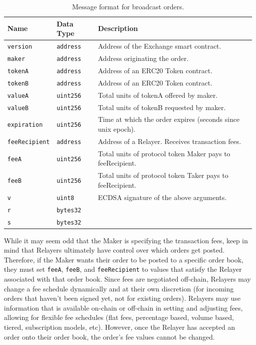 \documentclass[10pt]{article}
\begin{document}
\begin{table}[h]
\centering
\caption{Message format for broadcast orders.}
\label{table:table2}
\begin{tabular}{|l|l|l|}
\hline
\textbf{Name} & \textbf{Data Type} & \textbf{Description} \\ \hline
\texttt{version} & \texttt{address} & Address of the Exchange smart contract. \\ \hline
\texttt{maker} & \texttt{address} & Address originating the order.  \\ \hline
\texttt{tokenA} & \texttt{address} & Address of an ERC20 Token contract. \\ \hline
\texttt{tokenB} & \texttt{address} & Address of an ERC20 Token contract. \\ \hline
\texttt{valueA} & \texttt{uint256} & Total units of tokenA offered by maker. \\ \hline
\texttt{valueB} & \texttt{uint256} & Total units of tokenB requested by maker. \\ \hline
\texttt{expiration} & \texttt{uint256} & Time at which the order expires (seconds since unix epoch). \\ \hline
\texttt{feeRecipient} & \texttt{address} & Address of a Relayer. Receives transaction fees. \\ \hline
\texttt{feeA} & \texttt{uint256} & Total units of protocol token Maker pays to feeRecipient. \\ \hline
\texttt{feeB} & \texttt{uint256} & Total units of protocol token Taker pays to feeRecipient. \\ \hline
\texttt{v} & \texttt{uint8} & ECDSA signature of the above arguments. \\ \cline{1-2}
\texttt{r} & \texttt{bytes32} & \\ \cline{1-2}
\texttt{s} & \texttt{bytes32} & \\ \hline
\end{tabular}
\end{table}

\noindent While it may seem odd that the Maker is specifying the transaction fees, keep in mind that Relayers ultimately have control over which orders get posted. Therefore, if the Maker wants their order to be posted to a specific order book, they must set \texttt{feeA}, \texttt{feeB}, and \texttt{feeRecipient} to values that satisfy the Relayer associated with that order book. Since fees are negotiated off-chain, Relayers may change a fee schedule dynamically and at their own discretion (for incoming orders that haven't been signed yet, not for existing orders). Relayers may use information that is available on-chain or off-chain in setting and adjusting fees, allowing for flexible fee schedules (flat fees, percentage based, volume based, tiered, subscription models, etc). However, once the Relayer has accepted an order onto their order book, the order's fee values cannot be changed. \\
\end{document}
